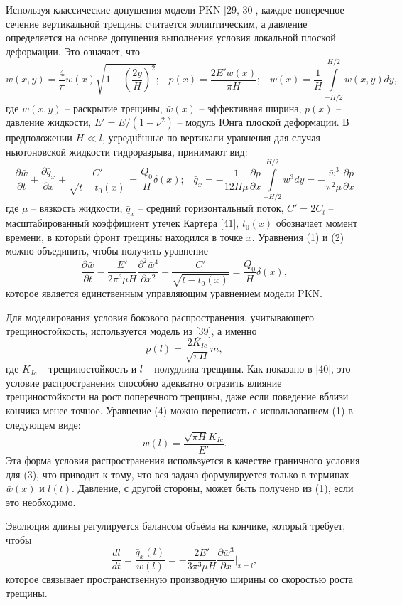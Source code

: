 \documentclass[a4paper, 12pt]{article}
\newcommand{\beq}{\begin{equation}}
\newcommand{\eeq}{\end{equation}}
\begin{document}
Используя классические допущения модели PKN [29, 30], каждое поперечное сечение вертикальной трещины считается эллиптическим, а давление определяется на основе допущения выполнения условия локальной плоской деформации.
Это означает, что
\beq
w(x,y)=\frac{4}{\pi}\bar{w}(x)\sqrt{1-\left(\frac{2y}{H}\right)^2};\,\,\,\,\,
p(x)=\frac{2E'\bar{w}(x)}{\pi H};\,\,\,\,\,
\bar{w}(x)=\frac{1}{H}\int\limits_{-H/2}^{H/2}{w(x,y)dy},
\eeq
где $w(x,y)$ -- раскрытие трещины,
$\bar{w}(x)$ -- эффективная ширина,
$p(x)$ -- давление жидкости,
$E'=E/(1-\nu^2)$ -- модуль Юнга плоской деформации.
В предположении $H\ll l$, усреднённые по вертикали уравнения для случая ньютоновской жидкости гидроразрыва, принимают вид:
\beq
\frac{\partial\bar{w}}{\partial t}+\frac{\partial\bar{q}_x}{\partial x}+\frac{C'}{\sqrt{t-t_0(x)}}=\frac{Q_0}{H}\delta(x);\,\,\,\,\,
\bar{q}_x=-\frac{1}{12H\mu}\frac{\partial p}{\partial x}\int\limits_{-H/2}^{H/2}w^3dy=-\frac{\bar{w}^3}{\pi^2\mu}\frac{\partial p}{\partial x}
\eeq
где
$\mu$ -- вязкость жидкости,
$\bar{q}_x$ -- средний горизонтальный поток,
$C'=2C_l$ -- масштабированный коэффициент утечек Картера [41],
$t_0(x)$ обозначает момент времени, в который фронт трещины находился в точке $x$.
Уравнения (1) и (2) можно объединить, чтобы получить уравнение
\beq
\frac{\partial\bar{w}}{\partial t}-\frac{E'}{2\pi^3\mu H}\frac{\partial^2\bar{w}^4}{\partial x^2}+\frac{C'}{\sqrt{t-t_0(x)}}=\frac{Q_0}{H}\delta(x),
\eeq
которое является единственным управляющим уравнением модели PKN.

Для моделирования условия бокового распространения, учитывающего трещиностойкость, используется модель из [39], а именно
\beq
p(l)=\frac{2K_{Ic}}{\sqrt{\pi H}}m,
\eeq
где $K_{Ic}$ -- трещиностойкость и $l$ -- полудлина трещины.
Как показано в [40], это условие распространения способно адекватно отразить влияние трещиностойкости на рост поперечного трещины, даже если поведение вблизи кончика менее точное.
Уравнение (4) можно переписать с использованием (1) в следующем виде:
\beq
\bar{w}(l)=\frac{\sqrt{\pi H}K_{Ic}}{E'}.
\eeq
Эта форма условия распространения используется в качестве граничного условия для (3), что приводит к тому, что вся задача формулируется только в терминах $\bar{w}(x)$ и $l(t)$.
Давление, с другой стороны, может быть получено из (1), если это необходимо.

Эволюция длины регулируется балансом объёма на кончике, который требует, чтобы
\beq
\frac{dl}{dt}=\frac{\bar{q}_x(l)}{\bar{w}(l)}=-\frac{2E'}{3\pi^3\mu H}\frac{\partial\bar{w}^3}{\partial x}\bigg|_{x=l},
\eeq
которое связывает пространственную производную ширины со скоростью роста трещины.
\end{document}
